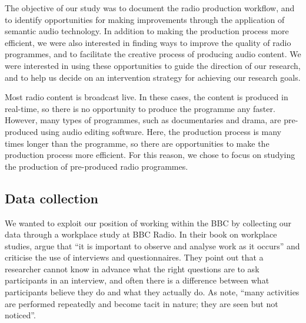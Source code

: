 The objective of our study was to document the radio production workflow, and to identify opportunities for making
improvements through the application of semantic audio technology.  In addition to making the production process more
efficient, we were also interested in finding ways to improve the quality of radio programmes, and to facilitate the
creative process of producing audio content.  We were interested in using these opportunities to guide the direction of
our research, and to help us decide on an intervention strategy for achieving our research goals. 

Most radio content is broadcast live. In these cases, the content is produced in real-time, so there is no opportunity
to produce the programme any faster. However, many types of programmes, such as documentaries and drama, are
pre-produced using audio editing software. Here, the production process is many times longer than the programme, so
there are opportunities to make the production process more efficient.  For this reason, we chose to focus on studying
the production of pre-produced radio programmes.

\subsection{Data collection}


We wanted to exploit our position of working within the BBC by collecting our data through a workplace study at BBC
Radio.  In their book on workplace studies, \citet{Luff2000} argue that ``it is important to observe and analyse work
as it occurs'' and criticise the use of interviews and questionnaires. They point out that a researcher cannot know in
advance what the right questions are to ask participants in an interview, and often there is a difference between what
participants believe they do and what they actually do. As \citet[p.~245]{Luff2000} note, ``many activities are
performed repeatedly and become tacit in nature; they are seen but not noticed''.

